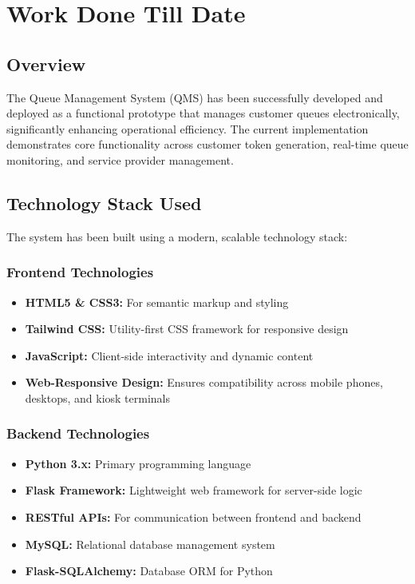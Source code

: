 \documentclass[12pt,a4paper]{report}
\begin{document}
\newpage
\chapter{Work Done Till Date}

\section{Overview}

The Queue Management System (QMS) has been successfully developed and deployed as a functional prototype that manages customer queues electronically, significantly enhancing operational efficiency. The current implementation demonstrates core functionality across customer token generation, real-time queue monitoring, and service provider management.

\section{Technology Stack Used}

The system has been built using a modern, scalable technology stack:

\subsection{Frontend Technologies}
\begin{itemize}
    \item \textbf{HTML5 \& CSS3:} For semantic markup and styling
    \item \textbf{Tailwind CSS:} Utility-first CSS framework for responsive design
    \item \textbf{JavaScript:} Client-side interactivity and dynamic content
    \item \textbf{Web-Responsive Design:} Ensures compatibility across mobile phones, desktops, and kiosk terminals
\end{itemize}

\subsection{Backend Technologies}
\begin{itemize}
    \item \textbf{Python 3.x:} Primary programming language
    \item \textbf{Flask Framework:} Lightweight web framework for server-side logic
    \item \textbf{RESTful APIs:} For communication between frontend and backend
    \item \textbf{MySQL:} Relational database management system
    \item \textbf{Flask-SQLAlchemy:} Database ORM for Python
\end{itemize}
\end{document}
